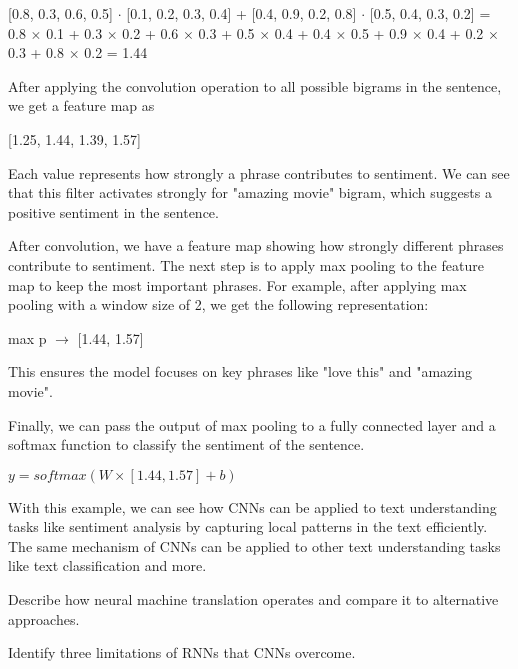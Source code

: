 \documentclass[10pt]{article}
\begin{document}
\begin{description}
\begin{center}
    [0.8, 0.3, 0.6, 0.5] $\cdot$ [0.1, 0.2, 0.3, 0.4] + [0.4, 0.9, 0.2, 0.8] $\cdot$ [0.5, 0.4, 0.3, 0.2] = 0.8 $\times$ 0.1 + 0.3 $\times$ 0.2 + 0.6 $\times$ 0.3 + 0.5 $\times$ 0.4 + 0.4 $\times$ 0.5 + 0.9 $\times$ 0.4 + 0.2 $\times$ 0.3 + 0.8 $\times$ 0.2 = 1.44
\end{center}

After applying the convolution operation to all possible bigrams in the sentence, we get a feature map as 

\begin{center}
    [1.25, 1.44, 1.39, 1.57]
\end{center}

Each value represents how strongly a phrase contributes to sentiment.
We can see that this filter activates strongly for "amazing movie" bigram, which suggests a positive sentiment in the sentence.

After convolution, we have a feature map showing how strongly different phrases contribute to sentiment.
The next step is to apply max pooling to the feature map to keep the most important phrases.
For example, after applying max pooling with a window size of 2, we get the following representation:

\begin{center}
    max p $\rightarrow$ [1.44, 1.57]
\end{center}

This ensures the model focuses on key phrases like "love this" and "amazing movie".

Finally, we can pass the output of max pooling to a fully connected layer and a softmax function to classify the sentiment of the sentence.

\begin{center}
    $y = softmax(W \times [1.44, 1.57] + b)$
\end{center}

With this example, we can see how CNNs can be applied to text understanding tasks like sentiment analysis by capturing local patterns in the text efficiently.
The same mechanism of CNNs can be applied to other text understanding tasks like text classification and more.

\pagebreak

\item[Problem 6:] \hfill Describe how neural machine translation operates and compare it to alternative approaches.

\pagebreak

\item[Problem 7:] \hfill Identify three limitations of RNNs that CNNs overcome.

\end{description}
\end{document}
